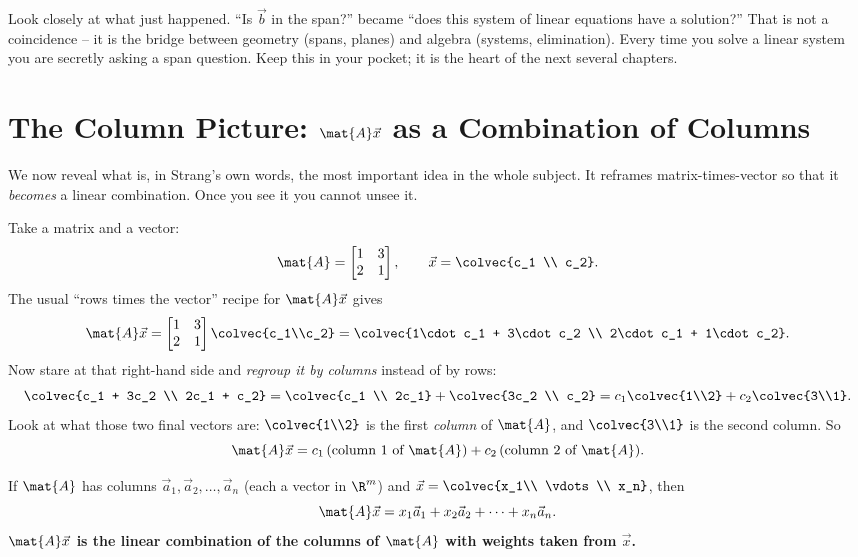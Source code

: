 \begin{focusbox}
Look closely at what just happened. ``Is $\vec{b}$ in the span?'' became ``does this system of linear equations have a solution?'' That is not a coincidence -- it is the bridge between geometry (spans, planes) and algebra (systems, elimination). Every time you solve a linear system you are secretly asking a span question. Keep this in your pocket; it is the heart of the next several chapters.
\end{focusbox}

\section{The Column Picture: $\mat{A}\vec{x}$ as a Combination of Columns}

We now reveal what is, in Strang's own words, the most important idea in the whole subject. It reframes matrix-times-vector so that it \emph{becomes} a linear combination. Once you see it you cannot unsee it.

Take a matrix and a vector:
\[
  \mat{A} = \begin{bmatrix} 1 & 3 \\ 2 & 1 \end{bmatrix}, \qquad \vec{x} = \colvec{c_1 \\ c_2}.
\]
The usual ``rows times the vector'' recipe for $\mat{A}\vec{x}$ gives
\[
  \mat{A}\vec{x}
  = \begin{bmatrix} 1 & 3 \\ 2 & 1 \end{bmatrix}\colvec{c_1\\c_2}
  = \colvec{1\cdot c_1 + 3\cdot c_2 \\ 2\cdot c_1 + 1\cdot c_2}.
\]
Now stare at that right-hand side and \emph{regroup it by columns} instead of by rows:
\[
  \colvec{c_1 + 3c_2 \\ 2c_1 + c_2}
  = \colvec{c_1 \\ 2c_1} + \colvec{3c_2 \\ c_2}
  = c_1\colvec{1\\2} + c_2\colvec{3\\1}.
\]
Look at what those two final vectors are: $\colvec{1\\2}$ is the first \emph{column} of $\mat{A}$, and $\colvec{3\\1}$ is the second column. So
\[
  \mat{A}\vec{x} = c_1\,(\text{column 1 of }\mat{A}) + c_2\,(\text{column 2 of }\mat{A}).
\]

\begin{formalbox}
If $\mat{A}$ has columns $\vec{a}_1,\vec{a}_2,\dots,\vec{a}_n$ (each a vector in $\R^m$) and $\vec{x} = \colvec{x_1\\ \vdots \\ x_n}$, then
\[
  \mat{A}\vec{x} = x_1\vec{a}_1 + x_2\vec{a}_2 + \cdots + x_n\vec{a}_n.
\]
\textbf{$\mat{A}\vec{x}$ is the linear combination of the columns of $\mat{A}$ with weights taken from $\vec{x}$.}
\end{formalbox}


